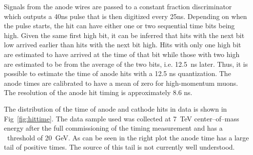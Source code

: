 Signals from the anode wires are passed to a constant fraction discriminator which outputs a 40ns pulse
that is then digitized every 25ns. Depending on when the pulse starts, the hit can have either one or two sequential time bits being high. Given the same
first high bit, it can be inferred that hits with the next bit low arrived earlier than hits with the next bit high.
Hits with only one high bit are estimated to have arrived at the time of that bit while those with two high are estimated to be from the average of the two bits, i.e. 12.5~ns
later.
Thus, it is possible to estimate the time of anode hits with a 12.5 ns quantization. The anode times are calibrated to have a mean of zero 
for high-momentum muons. The resolution of the anode hit timing is approximately 8.6 ns.


The distribution of the time of anode and cathode hits in data is shown in Fig~\ref{fig:hittime}.
The data sample used was collected at 7~TeV center--of--mass energy after the full commissioning of the timing measurement and has a \pt\ threshold of 20~GeV.
As can be seen in the right plot the anode time has a large tail of positive times. The source of this tail is not currently well understood.

